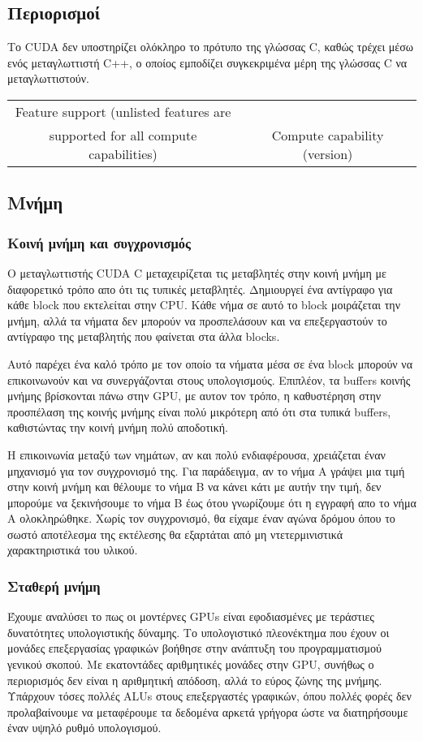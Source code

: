 \subsection{Περιορισμοί}
 Το CUDA δεν υποστηρίζει ολόκληρο το πρότυπο της γλώσσας C, καθώς τρέχει μέσω ενός μεταγλωττιστή C++, ο οποίος εμποδίζει συγκεκριμένα μέρη της γλώσσας C να μεταγλωττιστούν.
\begin{table}
\begin{tabular}{ | c | c |}
Feature support (unlisted features are\\ supported for all compute capabilities) & Compute capability (version)\\ \hline
\end{tabular}
\end{table}

\subsection{Μνήμη}
\subsubsection{Κοινή μνήμη και συγχρονισμός}
Ο μεταγλωττιστής CUDA C μεταχειρίζεται τις μεταβλητές στην κοινή μνήμη με διαφορετικό τρόπο απο ότι τις τυπικές μεταβλητές. Δημιουργεί ένα αντίγραφο για κάθε block που εκτελείται στην CPU. Κάθε νήμα σε αυτό το block μοιράζεται την μνήμη, αλλά τα νήματα δεν μπορούν να προσπελάσουν και να επεξεργαστούν το αντίγραφο της μεταβλητής που φαίνεται στα άλλα blocks.

Αυτό παρέχει ένα καλό τρόπο με τον οποίο τα νήματα μέσα σε ένα block μπορούν να επικοινωνούν και να συνεργάζονται στους υπολογισμούς. Επιπλέον, τα buffers κοινής μνήμης βρίσκονται πάνω στην GPU, με αυτον τον τρόπο, η καθυστέρηση στην προσπέλαση της κοινής μνήμης είναι πολύ μικρότερη από ότι στα τυπικά buffers, καθιστώντας την κοινή μνήμη πολύ αποδοτική.

Η επικοινωνία μεταξύ των νημάτων, αν και πολύ ενδιαφέρουσα, χρειάζεται έναν μηχανισμό για τον συγχρονισμό της. Για παράδειγμα, αν το νήμα Α γράψει μια τιμή στην κοινή μνήμη και θέλουμε το νήμα Β να κάνει κάτι με αυτήν την τιμή, δεν μπορούμε να ξεκινήσουμε το νήμα Β έως ότου γνωρίζουμε ότι η εγγραφή απο το νήμα Α ολοκληρώθηκε. Χωρίς τον συγχρονισμό, θα είχαμε έναν αγώνα δρόμου όπου το σωστό αποτέλεσμα της εκτέλεσης θα εξαρτάται από μη ντετερμινιστικά χαρακτηριστικά του υλικού.
\subsubsection{Σταθερή μνήμη}
Έχουμε αναλύσει το πως οι μοντέρνες GPUs είναι εφοδιασμένες με τεράστιες δυνατότητες υπολογιστικής δύναμης. Το υπολογιστικό πλεονέκτημα που έχουν οι μονάδες επεξεργασίας γραφικών βοήθησε στην ανάπτυξη του προγραμματισμού γενικού σκοπού. Με εκατοντάδες αριθμητικές μονάδες στην GPU, συνήθως ο περιορισμός δεν είναι η αριθμητική απόδοση, αλλά το εύρος ζώνης της μνήμης. Υπάρχουν τόσες πολλές ALUs στους επεξεργαστές γραφικών, όπου πολλές φορές δεν προλαβαίνουμε να μεταφέρουμε τα δεδομένα αρκετά γρήγορα ώστε να διατηρήσουμε έναν υψηλό ρυθμό υπολογισμού. 

